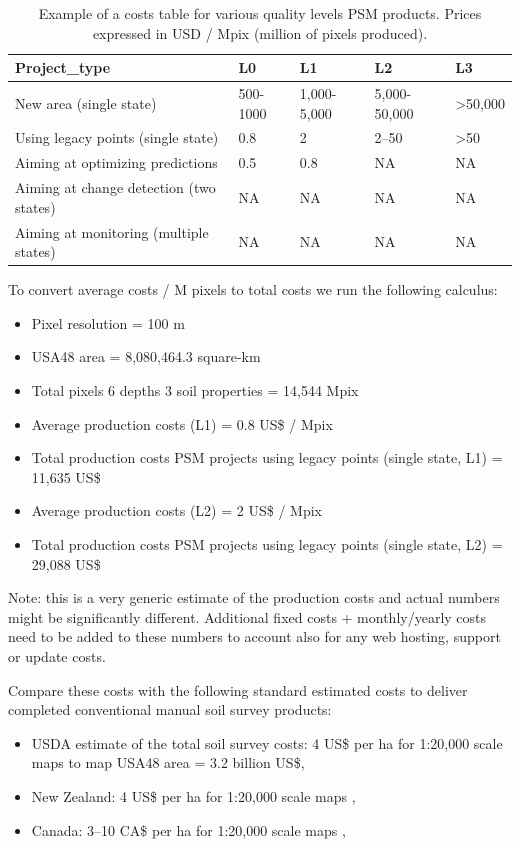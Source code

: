 \documentclass[graybox,natbib,nospthms,UStrade]{svmono}
\begin{document}
\begin{table}[t]

\caption{\label{tab:psm-table-costs}Example of a costs table for various quality levels PSM products. Prices expressed in USD / Mpix (million of pixels produced).}
\centering
\begin{tabular}{lllll}
\toprule
Project\_type & L0 & L1 & L2 & L3\\
\midrule
New area (single state) & 500-1000 & 1,000-5,000 & 5,000-50,000 & >50,000\\
Using legacy points (single state) & 0.8 & 2 & 2–50 & >50\\
Aiming at optimizing predictions & 0.5 & 0.8 & NA & NA\\
Aiming at change detection (two states) & NA & NA & NA & NA\\
Aiming at monitoring (multiple states) & NA & NA & NA & NA\\
\bottomrule
\end{tabular}
\end{table}

To convert average costs / M pixels to total costs we run the following
calculus:

\begin{itemize}
\item
  Pixel resolution = 100 m
\item
  USA48 area = 8,080,464.3 square-km
\item
  Total pixels 6 depths 3 soil properties = 14,544 Mpix
\item
  Average production costs (L1) = 0.8 US\$ / Mpix
\item
  Total production costs PSM projects using legacy points (single state,
  L1) = 11,635 US\$
\item
  Average production costs (L2) = 2 US\$ / Mpix
\item
  Total production costs PSM projects using legacy points (single state,
  L2) = 29,088 US\$
\end{itemize}

Note: this is a very generic estimate of the production costs and actual
numbers might be significantly different. Additional fixed costs +
monthly/yearly costs need to be added to these numbers to account also
for any web hosting, support or update costs.

Compare these costs with the following standard estimated costs to
deliver completed conventional manual soil survey products:

\begin{itemize}
\item
  USDA estimate of the total soil survey costs: 4 US\$ per ha for
  1:20,000 scale maps \citep{Durana2008} to map USA48 area = 3.2 billion
  US\$,
\item
  New Zealand: 4 US\$ per ha for 1:20,000 scale maps \citep{Carrick2010WCSS},
\item
  Canada: 3--10 CA\$ per ha for 1:20,000 scale maps \citep{MacMillan2010DSM},
\end{itemize}
\end{document}
